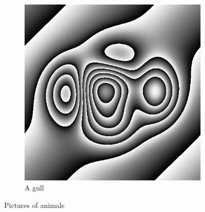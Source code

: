 \documentclass[letterpaper,12pt]{article}   %
\begin{document}
\begin{figure}
	\centering
    \begin{subfigure}
    		\centering
        \includegraphics[scale=0.40]{figures/faseRST.png}
        \caption{A gull}
        \label{fig:gull}
	\end{subfigure}%
	\caption{Pictures of animals}
\end{figure}
\end{document}
